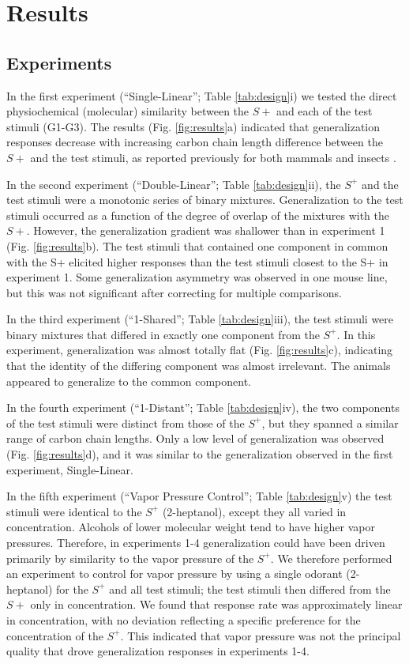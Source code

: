 \section*{Results}
\label{results}
\subsection*{Experiments}
\label{results_experiments}
In the first experiment (``Single-Linear''; Table \ref{tab:design}i) we tested the direct physiochemical (molecular) similarity between the $S+$ and each of the test stimuli (G1-G3). 
The results (Fig. \ref{fig:results}a) indicated that generalization responses decrease with increasing carbon chain length difference between the $S+$ and the test stimuli, as reported previously for both mammals and insects \cite{18810459}\cite{24488965}\cite{11551996}\cite{19129384}.  

In the second experiment (``Double-Linear''; Table \ref{tab:design}ii), the $S^+$ and the test stimuli were a monotonic series of binary mixtures.
Generalization to the test stimuli occurred as a function of the degree of overlap of the mixtures with the $S+$. 
However, the generalization gradient was shallower than in experiment 1 (Fig. \ref{fig:results}b). 
The test stimuli that contained one component in common with the S+ elicited higher responses than the test stimuli closest to the S+ in experiment 1. 
Some generalization asymmetry was observed in one mouse line, but this was not significant after correcting for multiple comparisons.   

In the third experiment (``1-Shared''; Table \ref{tab:design}iii), the test stimuli were binary mixtures that differed in exactly one component from the $S^+$.  
In this experiment, generalization was almost totally flat (Fig. \ref{fig:results}c), indicating that the identity of the differing component was almost irrelevant.  
The animals appeared to generalize to the common component.  

In the fourth experiment (``1-Distant''; Table \ref{tab:design}iv), the two components of the test stimuli were distinct from those of the $S^+$, but they spanned a similar range of carbon chain lengths. 
Only a low level of generalization was observed (Fig. \ref{fig:results}d), and it was similar to the generalization observed in the first experiment, Single-Linear.  

In the fifth experiment (``Vapor Pressure Control''; Table \ref{tab:design}v) the test stimuli were identical to the $S^+$ (2-heptanol), except they all varied in concentration.  
Alcohols of lower molecular weight tend to have higher vapor pressures.  
Therefore, in experiments 1-4 generalization could have been driven primarily by similarity to the vapor pressure of the $S^+$.  
We therefore performed an experiment to control for vapor pressure by using a single odorant (2-heptanol) for the $S^+$ and all test stimuli; the test stimuli then differed from the $S+$ only in concentration.  
We found that response rate was approximately linear in concentration, with no deviation reflecting a specific preference for the concentration of the $S^+$.  
This indicated that vapor pressure was not the principal quality that drove generalization responses in experiments 1-4.  